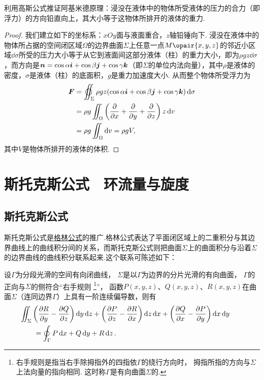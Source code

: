 \begin{example}
利用高斯公式推证阿基米德原理：浸没在液体中的物体所受液体的压力的合力（即浮力）的方向铅直向上，其大小等于这物体所排开的液体的重力.
\begin{proof}
我们建立如下的坐标系：\(xOy\)面与液面重合，\(z\)轴铅锤向下.
浸没在液体中的物体所占据的空间闭区域\(\Omega\)的边界曲面\(\Sigma\)上任意一点\(M\opair{x,y,z}\)的邻近小区域\(\dd{\sigma}\)所受的压力大小等于从它到液面间这部分液体（柱）的重力大小，即为\(\rho g z \dd{\sigma}\)，而方向是\(\boldsymbol{n}=\cos\alpha\boldsymbol{i}+\cos\beta\boldsymbol{j}+\cos\gamma\boldsymbol{k}\)（即\(\Sigma\)的单位内法向量），其中\(\rho\)是液体的密度，\(\sigma\)是液体（柱）的底面积，\(g\)是重力加速度大小.
从而整个物体所受浮力为\begin{align*}
\mat{F} &= \varoiint_{\Sigma} \rho g z (\cos\alpha\mat{i}+\cos\beta\mat{j}+\cos\gamma\mat{k}) \dd{\sigma} \\
&= \rho g \iint_{\Omega} \left(\pdv{x}+\pdv{y}+\pdv{z}\right) z \dd{v} \\
&= \rho g \iint_{\Omega} \dd{v}
= \rho g V,
\end{align*}其中\(V\)是物体所排开的液体的体积.
\end{proof}
\end{example}

\section{斯托克斯公式　环流量与旋度}
\subsection{斯托克斯公式}
斯托克斯公式是\hyperref[equation:线积分与面积分.格林公式]{格林公式}的推广.格林公式表达了平面闭区域上的二重积分与其边界曲线上的曲线积分间的关系，而斯托克斯公式则把曲面\(\Sigma\)上的曲面积分与沿着\(\Sigma\)的边界曲线的曲线积分联系起来.这个联系可陈述如下：

\begin{theorem}[斯托克斯公式]
设\(\Gamma\)为分段光滑的空间有向闭曲线，
\(\Sigma\)是以\(\Gamma\)为边界的分片光滑的有向曲面，
\(\Gamma\)的正向与\(\Sigma\)的侧符合“右手规则%
\footnote{右手规则是指当右手除拇指外的四指依\(\Gamma\)的绕行方向时，
拇指所指的方向与\(\Sigma\)上法向量的指向相同.
这时称\(\Gamma\)是有向曲面\(\Sigma\)的.}”，
函数\(P(x,y,z)\)、\(Q(x,y,z)\)、\(R(x,y,z)\)在曲面\(\Sigma\)（连同边界\(\Gamma\)）上具有一阶连续偏导数，则有
\begin{equation}\label{equation:线积分与面积分.斯托克斯公式}
\begin{split}
&\hspace{-20pt}\iint_{\Sigma}
	\left( \pdv{R}{y} - \pdv{Q}{z} \right)\dd{y}\dd{z}
	+\left( \pdv{P}{z} - \pdv{R}{x} \right)\dd{z}\dd{x}
	+\left( \pdv{Q}{x} - \pdv{P}{y} \right)\dd{x}\dd{y} \\
&= \oint_{\Gamma} P\dd{x}+Q\dd{y}+R\dd{z}.
\end{split}
\end{equation}
\end{theorem}

